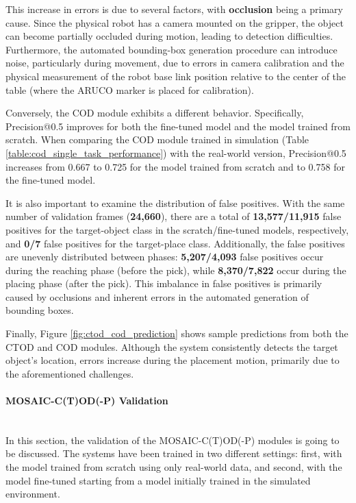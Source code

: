 This increase in errors is due to several factors, with \textbf{occlusion} being a primary cause. Since the physical robot has a camera mounted on the gripper, the object can become partially occluded during motion, leading to detection difficulties. Furthermore, the automated bounding-box generation procedure can introduce noise, particularly during movement, due to errors in camera calibration and the physical measurement of the robot base link position relative to the center of the table (where the ARUCO marker is placed for calibration).

Conversely, the COD module exhibits a different behavior. Specifically, Precision@0.5 improves for both the fine-tuned model and the model trained from scratch. When comparing the COD module trained in simulation (Table \ref{table:cod_single_task_performance}) with the real-world version, Precision@0.5 increases from 0.667 to 0.725 for the model trained from scratch and to 0.758 for the fine-tuned model. 

It is also important to examine the distribution of false positives. With the same number of validation frames (\textbf{24,660}), there are a total of \textbf{13,577/11,915} false positives for the target-object class in the scratch/fine-tuned models, respectively, and \textbf{0/7} false positives for the target-place class. Additionally, the false positives are unevenly distributed between phases: \textbf{5,207/4,093} false positives occur during the reaching phase (before the pick), while \textbf{8,370/7,822} occur during the placing phase (after the pick). This imbalance in false positives is primarily caused by occlusions and inherent errors in the automated generation of bounding boxes.

Finally, Figure \ref{fig:ctod_cod_prediction} shows sample predictions from both the CTOD and COD modules. Although the system consistently detects the target object's location, errors increase during the placement motion, primarily due to the aforementioned challenges.




\paragraph*{MOSAIC-C(T)OD(-P) Validation}\mbox{}\\
In this section, the validation of the MOSAIC-C(T)OD(-P) modules is going to be discussed. The systems have been trained in two different settings: first, with the model trained from scratch using only real-world data, and second, with the model fine-tuned starting from a model initially trained in the simulated environment.

